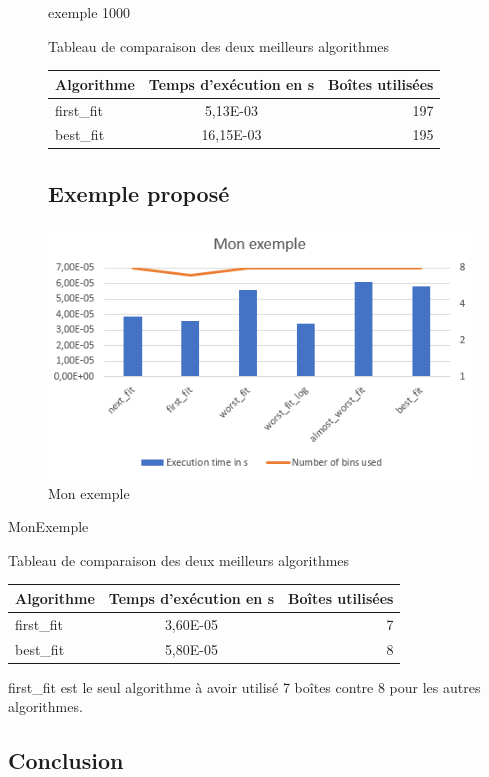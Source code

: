 \documentclass{article}
\begin{document}
\begin{figure}
\begin{center}


exemple 1000

Tableau de comparaison des deux meilleurs algorithmes

\begin{tabular}{|l|c|r|}
  \hline
  Algorithme & Temps d'exécution en s & Boîtes utilisées \\
  \hline
  first\_fit & 5,13E-03 & 197 \\
  best\_fit & 16,15E-03  & 195 \\
  \hline
\end{tabular}


\subsection{Exemple proposé}
\includegraphics{monexemple.png}
\end{center}
\caption{Mon exemple}
\end{figure}


MonExemple


Tableau de comparaison des deux meilleurs algorithmes

\begin{tabular}{|l|c|r|}
  \hline
  Algorithme & Temps d'exécution en s & Boîtes utilisées \\
  \hline
  first\_fit & 3,60E-05  & 7 \\
  best\_fit & 5,80E-05  & 8 \\
  \hline
\end{tabular}


first\_fit est le seul algorithme à avoir utilisé 7 boîtes contre 8 pour les autres algorithmes.


\subsection{Conclusion}
\end{document}
